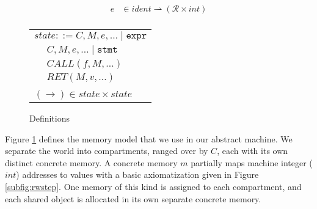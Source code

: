 \documentclass{article}
\begin{document}
\begin{figure}
\begin{minipage}[t]{0.49\textwidth}
\[\begin{aligned}
    e & \in \mathit{ident} \rightharpoonup (\mathcal{R} \times \mathit{int}) \\
    \end{aligned}\]
    \begin{tabular}{l | l}
      \multicolumn{2}{r}{\(\mathit{state} ::= C, M, e, \ldots \mid \mathtt{expr}\)} \\
      \hspace{4em} & \(C, M, e, \ldots \mid \mathtt{stmt}\) \\
      \hspace{4em} & \(\mathit{CALL}(f, M, \ldots)\)  \\
      \hspace{4em} & \(\mathit{RET}(M, v, \ldots)\) \\
      \multicolumn{2}{l}{} \\
      \multicolumn{2}{l}{\hspace{1.5em}\((\longrightarrow) \in
        \mathit{state} \times \mathit{state}\)} \\
    \end{tabular}
  \end{minipage}

  \caption{Definitions}
  \label{fig:memmod}
\end{figure}

Figure \ref{fig:memmod} defines the memory model that we use in our abstract machine.
We separate the world into compartments, ranged over by \(C\), each with its own distinct
concrete memory. A concrete memory \(m\) partially maps machine
integer (\(\mathit{int}\)) addresses to values with a basic axiomatization given in
Figure \ref{subfig:rwstep}. One memory of this kind is assigned to each compartment, and
each shared object is allocated in its own separate concrete memory.
\end{document}
